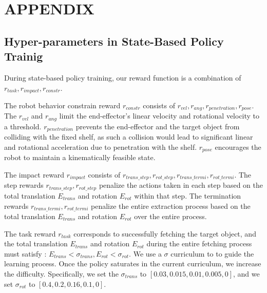 \clearpage
\onecolumn
\setcounter{page}{1}

\section{APPENDIX}

\subsection{Hyper-parameters in State-Based Policy Trainig}
During state-based policy training, our reward function is a combination of $r_{task}, r_{impact}, r_{constr}$. 

The robot behavior constrain reward $r_{constr}$ consists of $r_{vel}, r_{ang}, r_{penetration}, r_{pose}$. The $r_{vel}$ and $r_{ang}$ limit the end-effector's linear velocity and rotational velocity to a threshold. $r_{{penetration}}$ prevents the end-effector and the target object from colliding with the fixed shelf, as such a collision would lead to significant linear and rotational acceleration due to penetration with the shelf. $r_{pose}$ encourages the robot to maintain a kinematically feasible state.

The impact reward $r_{impact}$ consists of ${r_{trans\_step}, r_{rot\_step}, r_{trans\_termi}, r_{rot\_termi}}$. The step rewards $r_{trans\_step}, r_{rot\_step}$  penalize the actions taken in each step based on the total translation $E_{trans}$ and rotation $E_{rot}$ within that step. The termination rewards ${r_{trans\_termi}, r_{rot\_termi}}$ penalize the entire extraction process based on the total translation $E_{trans}$ and rotation $E_{rot}$ over the entire process.

The task reward $r_{task}$ corresponds to successfully fetching the target object, and the total translation $E_{trans}$ and rotation $E_{rot}$ during the entire fetching process must satisfy : $E_{trans} < \sigma_{trans}, E_{rot} < \sigma_{rot}$. We use a $\sigma$ curriculum to to guide the learning process. Once the policy saturates in the current curriculum, we increase the difficulty. Specifically, we set the $\sigma_{trans}$ to $[0.03, 0.015, 0.01, 0.005, 0]$, and we set $\sigma_{rot}$ to $[0.4, 0.2, 0.16, 0.1, 0]$.

